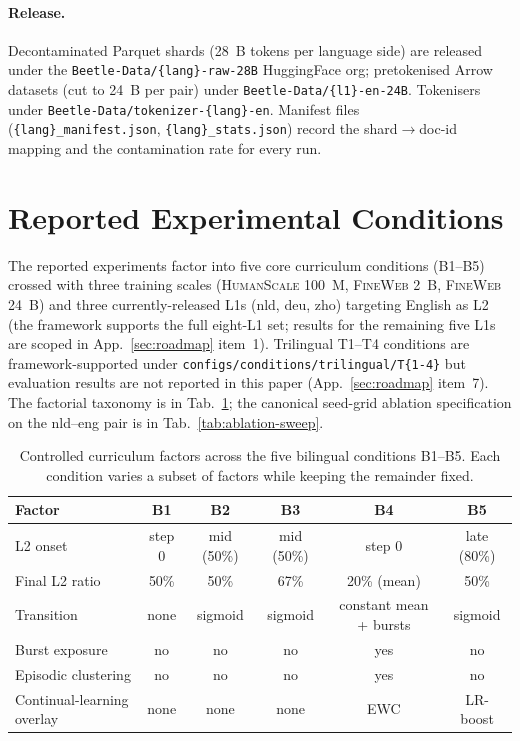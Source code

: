 \paragraph{Release.} Decontaminated Parquet shards (28~B tokens per language side) are released under the \texttt{Beetle-Data/\{lang\}-raw-28B} HuggingFace org; pretokenised Arrow datasets (cut to 24~B per pair) under \texttt{Beetle-Data/\{l1\}-en-24B}. Tokenisers under \texttt{Beetle-Data/tokenizer-\{lang\}-en}. Manifest files (\texttt{\{lang\}\_manifest.json}, \texttt{\{lang\}\_stats.json}) record the shard$\to$doc-id mapping and the contamination rate for every run.

\section{Reported Experimental Conditions}\label{sec:beetle-experiments}

The reported experiments factor into five core curriculum conditions (B1--B5) crossed with three training scales (\textsc{HumanScale} 100~M, \textsc{FineWeb} 2~B, \textsc{FineWeb} 24~B) and three currently-released L1s (nld, deu, zho) targeting English as L2 (the framework supports the full eight-L1 set; results for the remaining five L1s are scoped in App.~\ref{sec:roadmap} item~1). Trilingual T1--T4 conditions are framework-supported under \texttt{configs/conditions/trilingual/T\{1-4\}} but evaluation results are not reported in this paper (App.~\ref{sec:roadmap} item~7). The factorial taxonomy is in Tab.~\ref{tab:taxonomy}; the canonical seed-grid ablation specification on the nld--eng pair is in Tab.~\ref{tab:ablation-sweep}.

\begin{table}[t]
\centering
\small
\begin{tabular}{lccccc}
\toprule
\textbf{Factor} & \textbf{B1} & \textbf{B2} & \textbf{B3} & \textbf{B4} & \textbf{B5} \\
\midrule
L2 onset & step 0 & mid (50\%) & mid (50\%) & step 0 & late (80\%) \\
Final L2 ratio & 50\% & 50\% & 67\% & 20\% (mean) & 50\% \\
Transition & none & sigmoid & sigmoid & constant mean + bursts & sigmoid \\
Burst exposure & no & no & no & yes & no \\
Episodic clustering & no & no & no & yes & no \\
Continual-learning overlay & none & none & none & EWC & LR-boost \\
\bottomrule
\end{tabular}
\caption{Controlled curriculum factors across the five bilingual conditions B1--B5. Each condition varies a subset of factors while keeping the remainder fixed.}
\label{tab:taxonomy}
\end{table}


